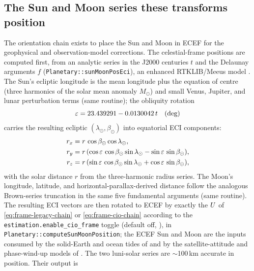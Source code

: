 \documentclass[main.tex]{subfiles}
\begin{document}
\subsection{The Sun and Moon series these transforms position}
\label{sec:frame-sunmoon}

The orientation chain exists to place the Sun and Moon in ECEF for the
geophysical and observation-model corrections.  The
celestial-frame positions are computed first, from an analytic series in
the J2000 centuries $t$ and the Delaunay arguments $f$
(\texttt{Planetary::sunMoonPosEci}), an enhanced
RTKLIB/Meeus model \cite{meeus1991, montenbruck2000}.  The Sun's
ecliptic longitude is the mean longitude plus the equation of centre
(three harmonics of the solar mean anomaly $M_\odot$) and small Venus,
Jupiter, and lunar perturbation terms (same routine); the obliquity
rotation
\begin{equation}
\varepsilon = 23.439291 - 0.0130042\,t \quad(\text{deg})
\label{eq:frame-obliquity}
\end{equation}
carries the resulting ecliptic
$(\lambda_\odot, \beta_\odot)$ into equatorial ECI components:
\begin{align}
r_x &= r\,\cos\beta_\odot\cos\lambda_\odot, \nonumber\\
r_y &= r\,(\cos\varepsilon\,\cos\beta_\odot\sin\lambda_\odot - \sin\varepsilon\,\sin\beta_\odot), \label{eq:frame-eci-sun}\\
r_z &= r\,(\sin\varepsilon\,\cos\beta_\odot\sin\lambda_\odot + \cos\varepsilon\,\sin\beta_\odot), \nonumber
\end{align}
with the solar distance $r$ from the three-harmonic radius series.  The
Moon's longitude, latitude, and horizontal-parallax-derived distance
follow the analogous Brown-series truncation in the same five
fundamental arguments (same routine).  The resulting ECI vectors are
then
rotated to ECEF by exactly the $U$ of \eqref{eq:frame-legacy-chain}
or \eqref{eq:frame-cio-chain} according to the
\texttt{estimation.enable\_cio\_frame} toggle (default off,
), in
\texttt{Planetary::computeSunMoonPosition}; the ECEF Sun and Moon are
the inputs consumed by the solid-Earth and ocean tides of
 and by the
satellite-attitude and phase-wind-up models of
.  The two
luni-solar series are $\sim$100\,km accurate in position.  Their output is
\end{document}
